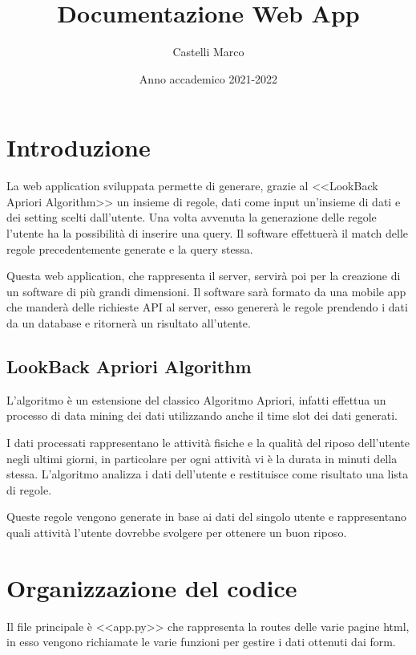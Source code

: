 \documentclass{article}
\title{Documentazione  Web App}
\author{Castelli Marco}
\date{Anno accademico 2021-2022}
\begin{document}
\maketitle
\newpage


\tableofcontents

\newpage

\section{Introduzione}

La web application sviluppata permette di generare, grazie al <<LookBack Apriori Algorithm>> un insieme di regole, dati come input un'insieme di dati e dei setting scelti dall'utente. Una volta avvenuta la generazione delle regole l'utente ha la possibilità di inserire una query. Il software effettuerà il match delle regole precedentemente generate e la query stessa.

Questa web application, che rappresenta il server, servirà poi per la creazione di un software di più grandi dimensioni. Il software sarà formato da una mobile app  che manderà delle richieste API al server, esso genererà le regole prendendo i dati da un database e ritornerà un risultato all'utente.

\subsection{LookBack Apriori Algorithm}
L'algoritmo è un estensione del classico Algoritmo Apriori, infatti effettua un processo di data mining dei dati utilizzando anche il time slot dei dati generati.

 I dati processati  rappresentano le attività fisiche e la qualità del riposo dell'utente negli ultimi giorni, in particolare per ogni attività vi è la durata in minuti della stessa. L'algoritmo  analizza i dati dell'utente e restituisce come risultato una lista di regole. 

Queste regole vengono generate in base ai dati del singolo utente e rappresentano quali attività l'utente dovrebbe svolgere per ottenere un buon riposo.

\section{Organizzazione del codice}
Il file principale è <<app.py>> che rappresenta la routes delle varie pagine html, in esso vengono richiamate le varie funzioni per gestire i dati ottenuti dai form.
\end{document}
